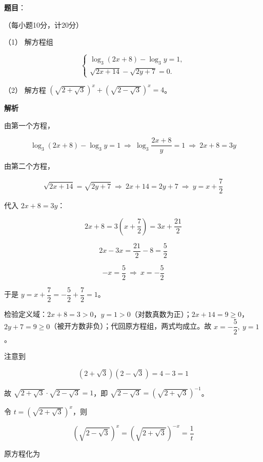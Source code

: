 \begin{answer}

\textbf{题目}：

（每小题10分，计20分）

（1） 解方程组

\nopagebreak[4]
\[
\begin{cases}
\log_3(2x+8)-\log_3 y=1,\\
\sqrt{2x+14}-\sqrt{2y+7}=0.
\end{cases}
\]

（2） 解方程 $\left(\sqrt{2+\sqrt3}\right)^x+\left(\sqrt{2-\sqrt3}\right)^x=4$。

\textbf{解析}


由第一个方程，

\nopagebreak[4]
\[
\log_3(2x+8)-\log_3y=1\ \Longrightarrow\ \log_3\frac{2x+8}y=1\ \Longrightarrow\ 2x+8=3y
\]

由第二个方程，

\nopagebreak[4]
\[
\sqrt{2x+14}=\sqrt{2y+7}\ \Longrightarrow\ 2x+14=2y+7\ \Longrightarrow\ y=x+\frac72
\]

代入 $2x+8=3y$：

\nopagebreak[4]
\[
2x+8=3\left(x+\frac72\right)=3x+\frac{21}2
\]

\nopagebreak[4]
\[
2x-3x=\frac{21}2-8=\frac52
\]

\nopagebreak[4]
\[
-x=\frac52\ \Longrightarrow\ x=-\frac52
\]

于是 $y=x+\dfrac72=-\dfrac52+\dfrac72=1$。

检验定义域：$2x+8=3>0$，$y=1>0$（对数真数为正）；$2x+14=9\ge0$，$2y+7=9\ge0$（被开方数非负）；代回原方程组，两式均成立。故 $x=-\dfrac52,\ y=1$。


注意到

\nopagebreak[4]
\[
(2+\sqrt3)(2-\sqrt3)=4-3=1
\]

故 $\sqrt{2+\sqrt3}\cdot\sqrt{2-\sqrt3}=1$，即 $\sqrt{2-\sqrt3}=\left(\sqrt{2+\sqrt3}\right)^{-1}$。

令 $t=\left(\sqrt{2+\sqrt3}\right)^x$，则

\nopagebreak[4]
\[
\left(\sqrt{2-\sqrt3}\right)^x=\left(\sqrt{2+\sqrt3}\right)^{-x}=\frac1t
\]

原方程化为


\end{answer}
